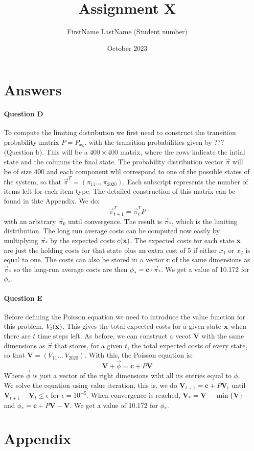 \documentclass{article}
\title{Assignment X}
\author{FirstName LastName (Student number)}
\date{October 2023}
\begin{document}
\maketitle

\section{Answers}

\paragraph{Question D} To compute the limiting distribution we first need to construct the transition probability matrix \(P = P_{xy}\), with the transition probabilities given by ??? (Question b). This will be a \(400 \times 400\) matrix, where the rows indicate the intial state and the columns the final state. The probability distribution vector \(\vec{\pi}\) will be of size \(400\) and each component wlil correspond to one of the possible states of the system, so that \(\vec{\pi}^T = (\pi_{11} \hdots~ \pi_{2020})\). Each subscript represents the number of items left for each item type. The detailed construction of this matrix can be found in thte Appendix.
We do:
\[
\vec{\pi}_{t+1}^T = \vec{\pi}_{t}^T P 
\]
with an arbitrary \(\vec{\pi}_0\) until convergence. The result is \(\vec{\pi}_*\), which is the limiting distribution. The long run average costs can be computed now easily by multiplying \(\vec{\pi}_*\) by the  expected costs \(c({\mathbf x})\). The expected costs for each state \({\mathbf x}\) are just the holding costs for that state plus an extra cost of 5 if either \(x_1\) or \(x_2\) is equal to one. The costs can also be stored in a vector \(\mathbf{c}\) of the same dimensions as \(\vec{\pi}_*\) so the long-run average costs are then \(\phi_* = \mathbf{c}\cdot \vec{\pi}_*\). We get a value of 10.172 for \(\phi_*\). 

\paragraph{Question E} Before defining the Poisson equation we need to introduce the value function for this problem, \(V_t({\mathbf x})\). This gives the total expected costs for a given state \({\mathbf x}\) when there are \(t\) time steps left. As before, we can construct a vecot \(\mathbf{V}\) with the same dimensions as \(\vec{\pi}\) that stores, for a given \(t\), the total expected costs of every state, so that \(\mathbf{V} = (V_{11} \hdots~V_{2020})\). With this, the Poisson equation is:
\[
    \mathbf{V} + \vec{\phi} = \mathbf{c} + P\mathbf{V}
\]
Where \(\vec{\phi}\) is just a vector of the right dimensions wiht all its entries equal to \(\phi\). 
We solve the equation using value iteration, this is, we do \(\mathbf{V}_{t+1} = \mathbf{c} + P\mathbf{V}_t\) until \(\mathbf{V}_{t+1} - \mathbf{V}_t \leq \epsilon\) for \(\epsilon = 10^{-5}\). When convergence is reached, \(\mathbf{V}_* = \mathbf{V} - \min\{\mathbf{V}\}\) and \(\phi_* = \mathbf{c} + P\mathbf{V} - \mathbf{V}\). We get a value of 10.172 for \(\phi_*\).

\appendix
\section{Appendix}
\end{document}
